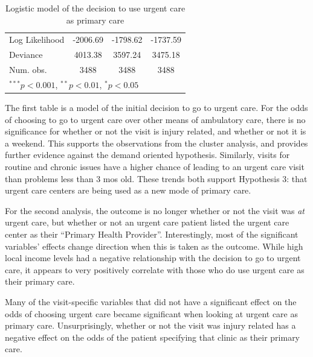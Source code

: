 \documentclass[12pt,twoside]{reedthesis}
\begin{document}
\begin{table}
\begin{center}
\begin{small}
\begin{tabular}{l c c c }
  Log Likelihood                & -2006.69               & -1798.62               & -1737.59               \\
  Deviance                      & 4013.38                & 3597.24                & 3475.18                \\
  Num. obs.                     & 3488                   & 3488                   & 3488                   \\
  \hline
  \multicolumn{4}{l}{\tiny{$^{***}p<0.001$, $^{**}p<0.01$, $^*p<0.05$}}
  \end{tabular}
  \end{small}
  \caption{Logistic model of the decision to use urgent care as primary care}
  \label{table:coefficients}
  \end{center}
  \end{table}
  
  \doublespacing
  
  The first table is a model of the initial decision to go to urgent care.
  For the odds of choosing to go to urgent care over other means of
  ambulatory care, there is no significance for whether or not the visit
  is injury related, and whether or not it is a weekend. This supports the
  observations from the cluster analysis, and provides further evidence
  against the demand oriented hypothesis. Similarly, visits for routine
  and chronic issues have a higher chance of leading to an urgent care
  visit than problems less than 3 mos old. These trends both support
  Hypothesis 3: that urgent care centers are being used as a new mode of
  primary care.
  
  For the second analysis, the outcome is no longer whether or not the
  visit was \emph{at} urgent care, but whether or not an urgent care
  patient listed the urgent care center as their ``Primary Health
  Provider''. Interestingly, most of the significant variables' effects
  change direction when this is taken as the outcome. While high local
  income levels had a negative relationship with the decision to go to
  urgent care, it appears to very positively correlate with those who do
  use urgent care as their primary care.
  
  Many of the visit-specific variables that did not have a significant
  effect on the odds of choosing urgent care became significant when
  looking at urgent care as primary care. Unsurprisingly, whether or not
  the visit was injury related has a negative effect on the odds of the
  patient specifying that clinic as their primary care.
  
\end{document}
